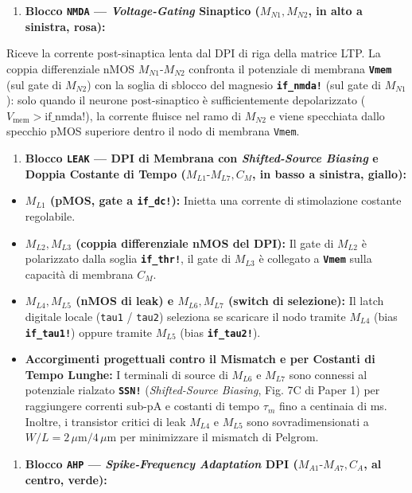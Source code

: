 \documentclass[11pt,a4paper]{article}
\begin{document}
\begin{enumerate}
  \item \textbf{Blocco \texttt{NMDA} --- \textit{Voltage-Gating} Sinaptico ($M_{N1}, M_{N2}$, in alto a sinistra, rosa):}
\end{enumerate}
Riceve la corrente post-sinaptica lenta dal DPI di riga della matrice LTP. La coppia differenziale nMOS \textbf{$M_{N1}\text{-}M_{N2}$} confronta il potenziale di membrana \textbf{\texttt{Vmem}} (sul gate di $M_{N2}$) con la soglia di sblocco del magnesio \textbf{\texttt{if\_nmda!}} (sul gate di $M_{N1}$): solo quando il neurone post-sinaptico è sufficientemente depolarizzato ($V_{\text{mem}} > \text{if\_nmda!}$), la corrente fluisce nel ramo di $M_{N2}$ e viene specchiata dallo specchio pMOS superiore dentro il nodo di membrana \texttt{Vmem}.
\begin{enumerate}
  \item \textbf{Blocco \texttt{LEAK} --- DPI di Membrana con \textit{Shifted-Source Biasing} e Doppia Costante di Tempo ($M_{L1}\text{-}M_{L7}, C_M$, in basso a sinistra, giallo):}
\end{enumerate}
\begin{itemize}
  \item \textbf{$M_{L1}$ (pMOS, gate a \texttt{if\_dc!}):} Inietta una corrente di stimolazione costante regolabile.
  \item \textbf{$M_{L2}, M_{L3}$ (coppia differenziale nMOS del DPI):} Il gate di $M_{L2}$ è polarizzato dalla soglia \textbf{\texttt{if\_thr!}}, il gate di $M_{L3}$ è collegato a \textbf{\texttt{Vmem}} sulla capacità di membrana \textbf{$C_M$}.
  \item \textbf{$M_{L4}, M_{L5}$ (nMOS di leak) e $M_{L6}, M_{L7}$ (switch di selezione):} Il latch digitale locale (\texttt{tau1} / \texttt{tau2}) seleziona se scaricare il nodo tramite $M_{L4}$ (bias \textbf{\texttt{if\_tau1!}}) oppure tramite $M_{L5}$ (bias \textbf{\texttt{if\_tau2!}}).
  \item \textbf{Accorgimenti progettuali contro il Mismatch e per Costanti di Tempo Lunghe:} I terminali di source di $M_{L6}$ e $M_{L7}$ sono connessi al potenziale rialzato \textbf{\texttt{SSN!}} (\textit{Shifted-Source Biasing}, Fig. 7C di Paper 1) per raggiungere correnti sub-pA e costanti di tempo $\tau_m$ fino a centinaia di ms. Inoltre, i transistor critici di leak $M_{L4}$ e $M_{L5}$ sono sovradimensionati a \textbf{$W / L = 2\,\mu\text{m} / 4\,\mu\text{m}$} per minimizzare il mismatch di Pelgrom.
\end{itemize}
\begin{enumerate}
  \item \textbf{Blocco \texttt{AHP} --- \textit{Spike-Frequency Adaptation} DPI ($M_{A1}\text{-}M_{A7}, C_A$, al centro, verde):}
\end{enumerate}
\end{document}
